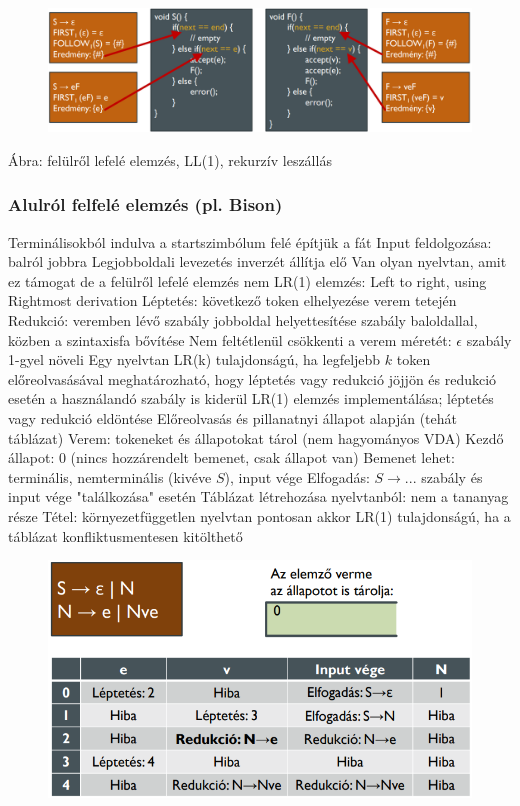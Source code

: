 \documentclass[12pt,a4paper]{article}
\begin{document}
\begin{figure}[h!]
	\centering
	\includegraphics[width=1\linewidth]{LL1}
\end{figure}

\begin{outline}
	\1 Ábra: felülről lefelé elemzés, LL(1), rekurzív leszállás
\end{outline}

\subsubsection{Alulról felfelé elemzés (pl. Bison)}

\begin{outline}
	\1 Terminálisokból indulva a startszimbólum felé építjük a fát
	\1 Input feldolgozása: balról jobbra
	\1 Legjobboldali levezetés inverzét állítja elő
	\1 Van olyan nyelvtan, amit ez támogat de a felülről lefelé elemzés nem
	\1 LR(1) elemzés: Left to right, using Rightmost derivation
	\1 Léptetés: következő token elhelyezése verem tetején
	\1 Redukció: veremben lévő szabály jobboldal helyettesítése szabály baloldallal, közben a 	szintaxisfa bővítése
		\2 Nem feltétlenül csökkenti a verem méretét: $\epsilon$ szabály 1-gyel növeli
	\1 Egy nyelvtan LR(k) tulajdonságú, ha legfeljebb $k$ token előreolvasásával meghatározható, hogy léptetés vagy redukció jöjjön és redukció esetén a használandó szabály is kiderül
	\1 LR(1) elemzés implementálása; léptetés vagy redukció eldöntése
		\2 Előreolvasás és pillanatnyi állapot alapján (tehát táblázat)
		\2 Verem: tokeneket és állapotokat tárol (nem hagyományos VDA)
		\2 Kezdő állapot: 0 (nincs hozzárendelt bemenet, csak állapot van)
		\2 Bemenet lehet: terminális, nemterminális (kivéve $S$), input vége
		\2 Elfogadás: $S \to ...$ szabály és input vége "találkozása" esetén
		\2 Táblázat létrehozása nyelvtanból: nem a tananyag része
		\2 Tétel: környezetfüggetlen nyelvtan pontosan akkor LR(1) tulajdonságú, ha a táblázat konfliktusmentesen kitölthető
\end{outline}

\begin{figure}[h!]
	\centering
	\includegraphics[width=0.7\linewidth]{LR1}
\end{figure}
\end{document}
